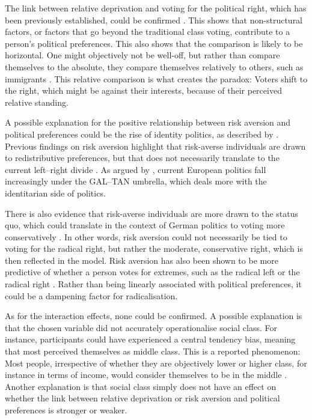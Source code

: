 \documentclass[stu,12pt]{apa7}
\begin{document}
The link between relative deprivation and voting for the political right, which has been previously established, could be confirmed \parencite{cenaRelativeDeprivationNational2023, burgoonPositionalDeprivationSupport2019, urbanskaSwayingExtremeGroup2018}. This shows that non-structural factors, or factors that go beyond the traditional class voting, contribute to a person’s political preferences. This also shows that the comparison is likely to be horizontal. One might objectively not be well-off, but rather than compare themselves to the absolute, they compare themselves relatively to others, such as immigrants \parencite{urbanskaSwayingExtremeGroup2018}. This relative comparison is what creates the paradox: Voters shift to the right, which might be against their interests, because of their perceived relative standing.

A possible explanation for the positive relationship between risk aversion and political preferences could be the rise of identity politics, as described by \textcite{bornschierHowUsThem2021b}. Previous findings on risk aversion highlight that risk-averse individuals are drawn to redistributive preferences, but that does not necessarily translate to the current left–right divide \parencite{gartnerIndividualRiskPreferences2017}. As argued by \textcite{hoogheDoesLeftRight2002a}, current European politics fall increasingly under the GAL–TAN umbrella, which deals more with the identitarian side of politics.

There is also evidence that risk-averse individuals are more drawn to the status quo, which could translate in the context of German politics to voting more conservatively \parencite{schwaningerRiskPreferencesDelegation2024}. In other words, risk aversion could not necessarily be tied to voting for the radical right, but rather the moderate, conservative right, which is then reflected in the model. Risk aversion has also been shown to be more predictive of whether a person votes for extremes, such as the radical left or the radical right \parencite{rooduijnParadoxWellbeingUnfavorable2018a}. Rather than being linearly associated with political preferences, it could be a dampening factor for radicalisation.

As for the interaction effects, none could be confirmed. A possible explanation is that the chosen variable did not accurately operationalise social class. For instance, participants could have experienced a central tendency bias, meaning that most perceived themselves as middle class. This is a reported phenomenon: Most people, irrespective of whether they are objectively lower or higher class, for instance in terms of income, would consider themselves to be in the middle \parencite{kulicMisperceptionsIndividualPosition}. Another explanation is that social class simply does not have an effect on whether the link between relative deprivation or risk aversion and political preferences is stronger or weaker.
\end{document}
